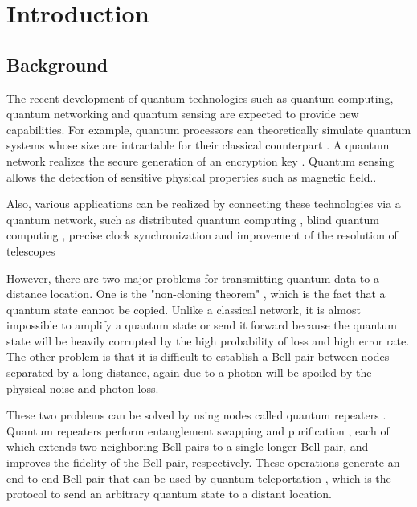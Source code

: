 \chapter{Introduction}
\label{introduction}

\section{Background}
\label{introduction:background} 

The recent development of quantum technologies such as quantum computing, quantum networking and quantum sensing are expected to provide new capabilities. 
For example, quantum processors can theoretically simulate quantum systems whose size are intractable for their classical counterpart \cite{feynman1982simulating}.
A quantum network realizes the secure generation of an encryption key \cite{Bennett_2014} \cite{PhysRevLett.67.661}.
Quantum sensing allows the detection of sensitive physical properties such as magnetic field.\cite{pmid:12686995}.

Also, various applications can be realized by connecting these technologies via a quantum network, such as distributed quantum computing \cite{Meter2016ThePT}, blind quantum computing \cite{arrighi2006blind}, precise clock synchronization \cite{jozsa2000quantum} and improvement of the resolution of telescopes \cite{PhysRevLett.123.070504}

However, there are two major problems for transmitting quantum data to a distance location.
One is the "non-cloning theorem" \cite{wootters1982single}, which is the fact that a quantum state cannot be copied. Unlike a classical network, it is almost impossible to amplify a quantum state or send it forward because the quantum state will be heavily corrupted by the high probability of loss and high error rate.
The other problem is that it is difficult to establish a Bell pair between nodes separated by a long distance, again due to a photon will be spoiled by the physical noise and photon loss.

These two problems can be solved by using nodes called quantum repeaters \cite{PhysRevLett.81.5932}. Quantum repeaters perform entanglement swapping \cite{zukowski1993event} and purification \cite{PhysRevA.53.2046}, each of which extends two neighboring Bell pairs to a single longer Bell pair, and improves the fidelity of the Bell pair, respectively.
These operations generate an end-to-end Bell pair that can be used by quantum teleportation \cite{PhysRevLett.70.1895}, which is the protocol to send an arbitrary quantum state to a distant location. 

